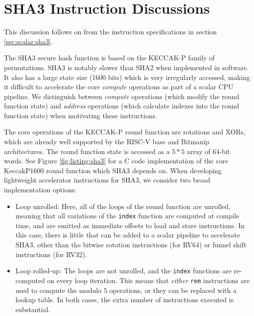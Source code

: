 
\section{SHA3 Instruction Discussions}
\label{sec:appendix:sha3}

This discussion follows on from the instruction specifications
in section
\ref{sec:scalar:sha3}.

The SHA3 secure hash function \cite{nist:fips:202} is based on
the KECCAK-P family of permutations.
SHA3 is notably slower than SHA2 when implemented in software.
It also has a large state size (1600 bits) which is very irregularly
accessed, making it difficult to accelerate
the core {\em compute} operations as part of a scalar CPU pipeline.
We distinguish between {\em compute} operations (which modify the
round function state) and {\em address} operations (which calculate
indexes into the round function state) when motivating these instructions.

The core operations of the KECCAK-P round function are rotations
and XORs, which are already well supported by the RISC-V
base and Bitmanip architectures.
The round function state is accessed as a $5*5$ array of
64-bit words.
See Figure \ref{fig:listing:sha3} for a C code implementation of
the core KeccakP1600 round function which SHA3 depends on.
When developing lightweight accelerator instructions for SHA3, we
consider two broad implementation options:

\begin{itemize}
\item Loop unrolled: Here, all of the loops of the round function are
    unrolled, meaning that all variations of the \lstinline{index}
    function are computed at compile time, and are emitted as immediate
    offsets to load and store instructions.
    In this case, there is little that can be added to a scalar
    pipeline to accelerate SHA3, other than the bitwise rotation instructions
    (for RV64) or funnel shift instructions (for RV32).
\item Loop rolled-up: The loops are not unrolled, and the
    \lstinline{index} functions are re-computed on every loop iteration.
    This means that {\em either} {\tt rem} instructions are used to
    compute the modulo $5$ operations, or they can be replaced with a
    lookup table.
    In both cases, the extra number of instructions executed is
    substantial.
\end{itemize}


